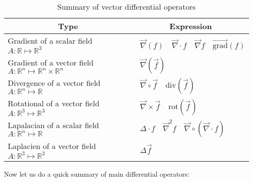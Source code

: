 	\begin{table}[H]
		\begin{center}
				\begin{tabular}{|p{8cm}|p{6cm}|}
					\hline
					\multicolumn{1}{c}{\cellcolor{black!30}\textbf{Type}} & 
	  \multicolumn{1}{c}{\cellcolor{black!30}\textbf{Expression}} \\ \hline
					Gradient of a scalar field $A:\mathbb{R}\mapsto \mathbb{R}^3$ & \centering\arraybackslash\ $\vec{\nabla}(f) \quad \vec{\nabla}\cdot f \quad \vec{\nabla}f \quad \overrightarrow{\text{grad}}(f)$ \\ \hline
					Gradient of a vector field $A:\mathbb{R}^n\mapsto \mathbb{R}^n\times \mathbb{R}^n$ & \centering\arraybackslash\ $\vec{\nabla}(\vec{f})$  \\ \hline
					Divergence of a vector field $A:\mathbb{R}^n\mapsto \mathbb{R}$ & \centering\arraybackslash\ $\vec{\nabla}\circ \vec{f}\quad \text{div}(\vec{f})$  \\ \hline
					Rotational of a vector field $A:\mathbb{R}^3\mapsto \mathbb{R}^3$ & \centering\arraybackslash\ $\vec{\nabla}\times\vec{f}\quad \text{rot}(\vec{f})$  \\ \hline
					Lapalacian of a scalar field $A:\mathbb{R}^n\mapsto \mathbb{R}$ & 		\centering\arraybackslash\ $\Delta \cdot f\quad \vec{\nabla}^2 f\quad \vec{\nabla}\circ(\vec{\nabla}\cdot f)$  \\ \hline
					Laplacien of a vector field $A:\mathbb{R}^3\mapsto \mathbb{R}^3$& \centering\arraybackslash\  $\Delta\vec{f}$  \\ \hline
			\end{tabular}
		\end{center}
		\caption{Summary of vector differential operators}
	\end{table}
	Now let us do a quick summary of main differential operators:
